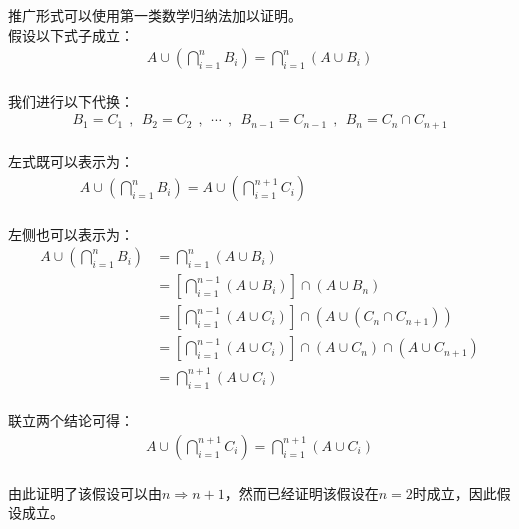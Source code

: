 \documentclass[UTF8]{ctexart}
\begin{document}
\newpage

    推广形式可以使用第一类数学归纳法加以证明。\\[3mm]
    假设以下式子成立：
    \setcounter{equation}{0}
    \begin{align}
        A\cup\left(\bigcap_{i=1}^n B_i\right)=\bigcap_{i=1}^n(A\cup B_i)
    \end{align}\\
    我们进行以下代换：
    \begin{align}
        B_1=C_1~~,~~B_2=C_2~~,~~\cdots~~,~~B_{n-1}=C_{n-1}~~,~~B_n=C_n\cap C_{n+1}
    \end{align}\\
    左式既可以表示为：
    \begin{align}
        A\cup\left(\bigcap_{i=1}^n B_i\right)=A\cup\left(\bigcap_{i=1}^{n+1} C_i\right)~~~~~~~~~~~~~~~~~~~~~~~~~~~~~~~~~~~~~~~~~~~
    \end{align}\\
    左侧也可以表示为：
    \begin{align}
        A\cup\left(\bigcap_{i=1}^n B_i\right)
        &=\bigcap_{i=1}^n(A\cup B_i)\\[3mm]
        &=\left[\bigcap_{i=1}^{n-1}(A\cup B_i)\right]\cap(A\cup B_n)\\[3mm]
        &=\left[\bigcap_{i=1}^{n-1}(A\cup C_i)\right]\cap(A\cup (C_n\cap C_{n+1}))\\[3mm]
        &=\left[\bigcap_{i=1}^{n-1}(A\cup C_i)\right]\cap(A\cup C_n)\cap(A\cup C_{n+1})\\[3mm]
        &=\bigcap_{i=1}^{n+1}(A\cup C_i)
    \end{align}\\
    联立两个结论可得：
    \begin{align}
        A\cup\left(\bigcap_{i=1}^{n+1} C_i\right)=\bigcap_{i=1}^{n+1}(A\cup C_i)
    \end{align}\\
    由此证明了该假设可以由$n\Rightarrow n+1$，然而已经证明该假设在$n=2$时成立，因此假设成立。

\newpage
\end{document}
